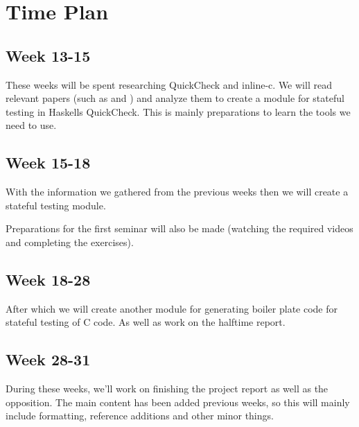 \section{Time Plan}


\subsection{Week 13-15}

These weeks will be spent researching QuickCheck and inline-c.
We will read relevant papers (such as \citep{QuickCheck} and \citep{QuickCheckQuviq}) and analyze them to create a module for stateful testing in Haskells QuickCheck.
This is mainly preparations to learn the tools we need to use.

\subsection{Week 15-18}

With the information we gathered from the previous weeks then we will create a stateful testing module.

Preparations for the first seminar will also be made (watching the required videos and completing the exercises).

\subsection{Week 18-28}

After which we will create another module for generating boiler plate code for stateful testing of C code.
As well as work on the halftime report.

\subsection{Week 28-31}

During these weeks, we'll work on finishing the project report as well as the opposition. The main content has been added previous weeks, so this will mainly include formatting, reference additions and other minor things.


